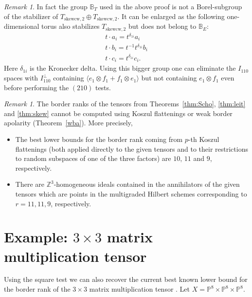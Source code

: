 \documentclass[12pt]{amsart}
\theoremstyle{definition}
\theoremstyle{remark}
\newtheorem{remark}[theorem]{Remark}
\theoremstyle{definition}
\newcommand{\PP}{\mathbb{P}}
\begin{document}
\begin{remark}
    In fact the group $\mathbb{B}_T$ used in the above proof is not a Borel-subgroup of the stabilizer of $T_{\mathrm{skewcw},2}\oplus T_{\mathrm{skewcw},2}$. It can be enlarged as the following one-dimensional torus also stabilizes $T_{\mathrm{skewcw},2}$ but does not belong to $\mathbb{B}_E$:
    \begin{align*}
    t\cdot a_i = t^{\delta_{1i}}a_i\\
    t\cdot b_i = t^{-1}t^{\delta_{1i}}b_i\\
    t\cdot c_i = t^{\delta_{1i}}c_i.
    \end{align*}
    Here $\delta_{1i}$ is the Kronecker delta. Using this bigger group one can eliminate the $I_{110}$ spaces with $I_{110}^\perp$ containing $\langle e_1\otimes f_1 + f_1\otimes e_1\rangle$ but not containing $e_1\otimes f_1$ even before performing the $(210)$ tests.
\end{remark}



\begin{remark}\label{rmk:about_techniques}
The border ranks of the tensors from Theorems~\ref{thm:Scho}, \ref{thm:leit} and  \ref{thm:skew} cannot be computed using Koszul flattenings \cite{LO15} or weak border apolarity (Theorem~\ref{wba}). More precisely,
\begin{itemize}
 \item The best lower bounds for the border rank coming from $p$-th Koszul flattenings (both applied directly to the given tensors and to their restrictions to random subspaces of one of the three factors) are  $10$, $11$ and $9$, respectively.
\item There are $\mathbb{Z}^3$-homogeneous ideals contained in the annihilators of the given tensors which are points in the multigraded Hilbert schemes corresponding to $r = 11, 11, 9$, respectively.
\end{itemize}
\end{remark}

\section{Example: \texorpdfstring{$3\times 3$}{3x3} matrix multiplication tensor}\label{s:m3}
Using the square test we can also recover the current best known lower bound for the border rank of the $3\times 3$ matrix multiplication tensor \cite[Theorem~1.1]{chl19}. Let $X = \PP^8\times \PP^8\times \PP^8$.
\end{document}
